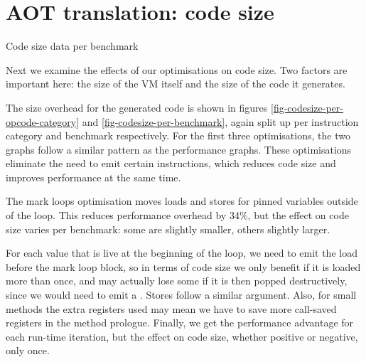 \section{AOT translation: code size}
\label{sec-evaluation-aot-translation-code-size}
\begin{table}[]
 \centering
 \caption{Code size data per benchmark}
 \label{tbl-codesize-per-benchmark}
 \small
 \scriptsize
 \setlength{\tabcolsep}{4pt}
 
 \setlength{\tabcolsep}{6pt}
\end{table}


Next we examine the effects of our optimisations on code size. Two factors are important here: the size of the VM itself and the size of the code it generates.

The size overhead for the generated code is shown in figures \ref{fig-codesize-per-opcode-category} and \ref{fig-codesize-per-benchmark}, again split up per instruction category and benchmark respectively. For the first three optimisations, the two graphs follow a similar pattern as the performance graphs. These optimisations eliminate the need to emit certain instructions, which reduces code size and improves performance at the same time.

The mark loops optimisation moves loads and stores for pinned variables outside of the loop. This reduces performance overhead by 34\%, but the effect on code size varies per benchmark: some are slightly smaller, others slightly larger.

For each value that is live at the beginning of the loop, we need to emit the load before the mark loop block, so in terms of code size we only benefit if it is loaded more than once, and may actually lose some if it is then popped destructively, since we would need to emit a . Stores follow a similar argument. Also, for small methods the extra registers used may mean we have to save more call-saved registers in the method prologue. Finally, we get the performance advantage for each run-time iteration, but the effect on code size, whether positive or negative, only once.

